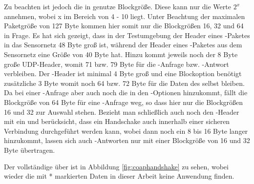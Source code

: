 Zu beachten ist jedoch die in  genutze Blockgröße. Diese kann nur die Werte $ 2^x $ annehmen, wobei x im Bereich von 4 - 10 liegt.
Unter Beachtung der maximalen Paketgröße von 127 Byte kommen hier somit nur die Blockgrößen 16, 32 und 64 in Frage. Es hat sich gezeigt,
dass in der Testumgebung der Header eines -Paketes in das Sensornetz 48 Byte groß ist, während der Header eines -Paketes
aus dem Sensornetz eine Größe von 40 Byte hat. Hinzu kommt jeweils noch der 8 Byte große UDP-Header, womit 71 bzw. 79 Byte für die -Anfrage bzw.
-Antwort verbleiben. Der -Header ist minimal 4 Byte groß und eine Blockoption benötigt zusätzliche 3 Byte womit noch 64 bzw. 72 Byte
für die Daten des  selbst bleiben. Da bei einer -Anfrage aber auch noch die  in den -Optionen hinzukommt,
fällt die Blockgröße von 64 Byte für eine -Anfrage weg, so dass hier nur die Blockgrößen 16 und 32 zur Auswahl stehen. Bezieht man schließlich
auch noch den -Header mit ein und berücksicht, dass ein Handschake auch innerhalb einer sicheren Verbindung durchgeführt werden kann, wobei
dann noch ein 8 bis 16 Byte langer  hinzukommt, lassen sich auch -Antworten nur mit einer Blockgröße von 16 und 32 Byte übertragen.

Der vollständige  über  ist in Abbildung \ref{fig:coaphandshake} zu sehen, wobei wieder die mit * markierten Daten
in dieser Arbeit keine Anwendung finden.

